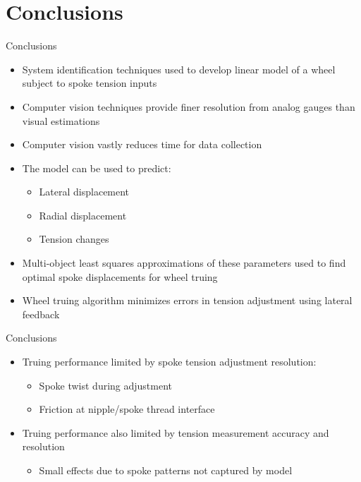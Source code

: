 \documentclass[mathserif]{beamer}
\begin{document}
\section{Conclusions}

\begin{frame}{Conclusions}
\begin{itemize}
    \item System identification techniques used to develop linear model of a wheel subject to spoke tension inputs
    \item Computer vision techniques provide finer resolution from analog gauges than visual estimations
    \item Computer vision vastly reduces time for data collection
    \item The model can be used to predict:
    \begin{itemize}
        \item{Lateral displacement}
        \item{Radial displacement}
        \item{Tension changes}
    \end{itemize}
    \item Multi-object least squares approximations of these parameters used to find optimal spoke displacements for wheel truing
    \item Wheel truing algorithm minimizes errors in tension adjustment using lateral feedback

\end{itemize}
\end{frame}

\begin{frame}{Conclusions}
\begin{itemize}
    \item Truing performance limited by spoke tension adjustment resolution: 
    \begin{itemize}
        \item{Spoke twist during adjustment}
        \item{Friction at nipple/spoke thread interface}
    \end{itemize}
    \item Truing performance also limited by tension measurement accuracy and resolution
    \begin{itemize}
        \item Small effects due to spoke patterns not captured by model
    \end{itemize}
\end{itemize}
\end{frame}
\end{document}
